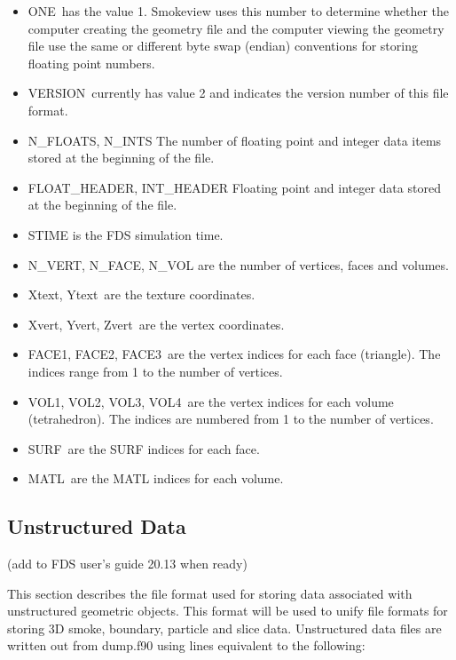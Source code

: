 \documentclass[12pt]{article}
\begin{document}
\begin{itemize}
\item {\ct ONE}\ has the value 1. Smokeview uses this number to determine whether the computer creating the geometry file and the computer viewing the geometry file use the same or different byte swap (endian) conventions for storing floating point numbers.
\item {\ct VERSION}\ currently has value 2 and indicates the version number of this file format.
\item {\ct N\_FLOATS, N\_INTS} The number of floating point and integer data items stored at the beginning of the file.
\item {\ct FLOAT\_HEADER, INT\_HEADER} Floating point and integer data stored at the beginning of the file.
\item {\ct STIME} is the FDS simulation time.
\item {\ct N\_VERT, N\_FACE, N\_VOL}  are the number of vertices, faces and volumes.
\item {\ct Xtext, Ytext}\ are the texture coordinates.
\item {\ct Xvert, Yvert, Zvert}\ are the vertex coordinates.
\item {\ct FACE1, FACE2, FACE3}\ are the vertex indices for each face (triangle).
    The indices range from 1 to the
    number of vertices.
\item {\ct VOL1, VOL2, VOL3, VOL4}\ are the vertex indices for each volume (tetrahedron).  The indices are numbered from 1 to the number of vertices.
\item {\ct SURF}\ are the SURF indices for each face.
\item {\ct MATL}\ are the MATL indices for each volume.
\end{itemize}


\subsection{Unstructured Data}

\label{out:GEOMETRYDATA}

(add to FDS user's guide 20.13 when ready)

This section describes the file format used for
storing data associated with unstructured geometric objects.  This format will be used to unify file formats for storing 3D smoke, boundary, particle and slice data.
Unstructured data files are written out from {\ct dump.f90} using lines equivalent to the following:
\end{document}
